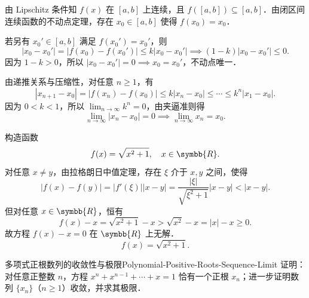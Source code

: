 \begin{solution}

    由 Lipschitz 条件知 $f(x)$ 在 $[a, b]$ 上连续，且 $f([a, b]) \subseteq [a, b]$．由闭区间连续函数的不动点定理，存在 $x_0 \in [a, b]$ 使得 $f(x_0) = x_0$．

    若另有 $x_0' \in [a, b]$ 满足 $f(x_0') = x_0'$，则
    \begin{equation}
        |x_0 - x_0'| = |f(x_0) - f(x_0')| \leqslant k |x_0 - x_0'| \implies (1 - k)|x_0 - x_0'| \leqslant 0.
    \end{equation}
    因为 $1 - k > 0$，所以 $|x_0 - x_0'| = 0 \implies x_0 = x_0'$，不动点唯一．


    由递推关系与压缩性，对任意 $n \geqslant 1$，有
    \begin{equation}
        |x_{n+1} - x_0| = |f(x_n) - f(x_0)| \leqslant k |x_n - x_0| \leqslant \cdots \leqslant k^n |x_1 - x_0|.
    \end{equation}
    因为 $0 < k < 1$，所以 $\lim_{n\to\infty} k^n = 0$，由夹逼准则得
    \begin{equation}
        \lim_{n\to\infty} |x_n - x_0| = 0 \implies \lim_{n\to\infty} x_n = x_0.
    \end{equation}


    构造函数
    \begin{equation}
        f(x) = \sqrt{x^2 + 1}, \quad x \in \symbb{R}.
    \end{equation}
    对任意 $x \neq y$，由拉格朗日中值定理，存在 $\xi$ 介于 $x, y$ 之间，使得
    \begin{equation}
        |f(x) - f(y)| = |f'(\xi)| |x - y| = \frac{|\xi|}{\sqrt{\xi^2 + 1}} |x - y| < |x - y|.
    \end{equation}
    但对任意 $x \in \symbb{R}$，恒有
    \begin{equation}
        f(x) - x = \sqrt{x^2 + 1} - x > \sqrt{x^2} - x = |x| - x \geqslant 0.
    \end{equation}
    故方程 $f(x) - x = 0$ 在 $\symbb{R}$ 上无解．
    \begin{equation}
        \boxed{f(x) = \sqrt{x^2 + 1}.}
    \end{equation}
\end{solution}

\begin{problem}{多项式正根数列的收敛性与极限}{Polynomial-Positive-Roots-Sequence-Limit}
    证明：对任意正整数 $n$，方程 $x^n + x^{n-1} + \cdots + x = 1$ 恰有一个正根 $x_n$；进一步证明数列 $\{x_n\}$（$n \geqslant 1$）收敛，并求其极限．
\end{problem}

